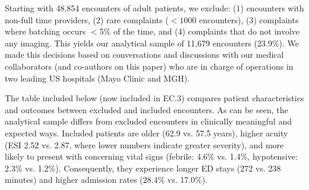 \documentclass[11pt]{article}
\newcommand{\1}{\hbox{\rm 1\kern-.35em 1}}
\begin{document}
Starting with 48,854 encounters of adult patients, we exclude: (1) encounters with non-full time providers, (2) rare complaints ($<1000$ encounters), (3) complaints where batching occurs $<$5\% of the time, and (4) complaints that do not involve any imaging. This yields our analytical sample of 11,679 encounters (23.9\%). We made this decisions based on conversations and discussions with our medical collaborators (and co-authors on this paper) who are in charge of operations in two leading US hospitals (Mayo Clinic and MGH).

The table included below (now included in EC.3) compares patient characteristics and outcomes between excluded and included encounters. As can be seen, the  analytical sample differs from excluded encounters in clinically meaningful and expected ways. Included patients are older (62.9 vs. 57.5 years), higher acuity (ESI 2.52 vs. 2.87, where lower numbers indicate greater severity), and more likely to present with concerning vital signs (febrile: 4.6\% vs. 1.4\%, hypotensive: 2.3\% vs. 1.2\%). Consequently, they experience longer ED stays (272 vs. 238 minutes) and higher admission rates (28.4\% vs. 17.0\%).
\end{document}
